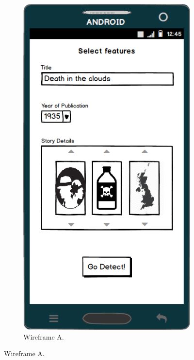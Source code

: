 \documentclass{mproj}
\begin{document}
\begin{figure}
	\centering
	\begin{subfigure}{0.3\textwidth}
		\includegraphics[width=\textwidth]{images/single_fruit_machine}
		\caption{Wireframe A.}
		\label{fig:wireframeA}		
	\end{subfigure}

\end{figure}
\end{document}

